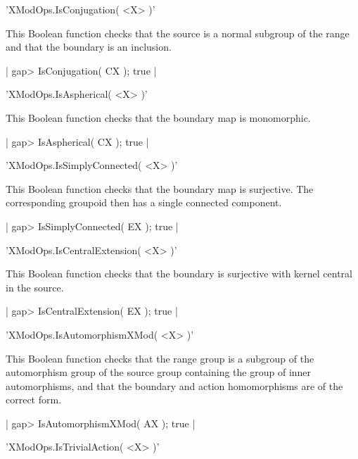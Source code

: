 'XModOps.IsConjugation( <X> )'

This Boolean function checks that the source is a normal subgroup 
of the range and that the boundary is an inclusion.

|    gap> IsConjugation( CX );
    true |

%

'XModOps.IsAspherical( <X> )'

This Boolean function checks that the boundary map is monomorphic.

|    gap> IsAspherical( CX );
    true |

%

'XModOps.IsSimplyConnected( <X> )'

This Boolean function checks that the boundary map is surjective.
The corresponding groupoid then has a single connected component.

|    gap> IsSimplyConnected( EX );
    true |

%

'XModOps.IsCentralExtension( <X> )'

This Boolean function checks that
the boundary is surjective with kernel central in the source.

|    gap> IsCentralExtension( EX );
    true |

%

'XModOps.IsAutomorphismXMod( <X> )'

This Boolean function checks that the range group is a subgroup 
of the automorphism group of the source group
containing the group of inner automorphisms,
and that the boundary and action homomorphisms are of the correct form.

|    gap> IsAutomorphismXMod( AX );
    true |

%

'XModOps.IsTrivialAction( <X> )'

